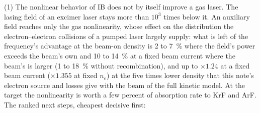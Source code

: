 \documentclass[11pt]{article}
\numberwithin{equation}{section}
\begin{document}
{\noindent}(1) The nonlinear behavior of IB does not by itself improve a gas
laser. The lasing field of an excimer laser stays more than $10^3$ times below it. An
auxiliary field reaches only the gas nonlinearity, whose effect on the distribution the
electron--electron collisions of a pumped laser largely supply: what is left of the
frequency's advantage at the beam-on density is 2 to 7~\% where the field's power
exceeds the beam's own and 10 to 14~\% at a fixed beam current where the beam's is larger
(1 to 18~\% without recombination), and up to $\times1.24$ at a fixed beam current
($\times1.355$ at fixed $n_e$) at the five times lower density that this note's electron
source and losses give with the beam of the full kinetic model. At the target the
nonlinearity
is worth a few percent of absorption rate to KrF and ArF. The ranked next steps,
cheapest decisive first:
\end{document}
